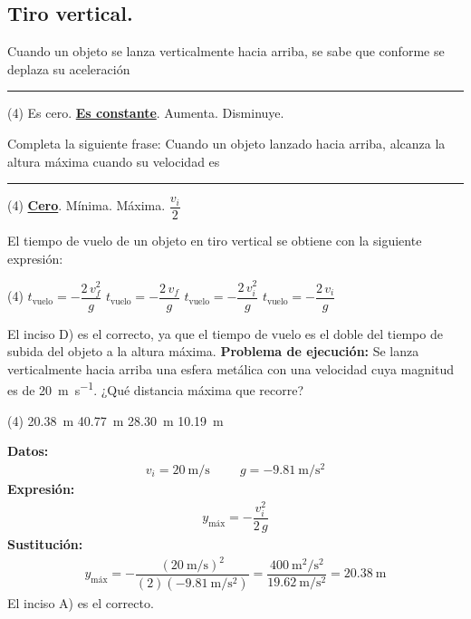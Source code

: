 \documentclass[12pt, letter]{exam}
\begin{document}
\begin{questions}
    \newpage

    \section{Tiro vertical.}

    \question Cuando un objeto se lanza verticalmente hacia arriba, se sabe que conforme se deplaza su aceleración \rule{2cm}{0.3mm}
    \begin{tasks}(4)
        \task Es cero.
        \task \underline{\textbf{Es constante}}.
        \task Aumenta.
        \task Disminuye.
    \end{tasks}
    \question Completa la siguiente frase: Cuando un objeto lanzado hacia arriba, alcanza la altura máxima cuando su velocidad es \rule{2cm}{0.3mm}
    \begin{tasks}(4)
        \task \underline{\textbf{Cero}}.
        \task Mínima.
        \task Máxima.
        \task $\dfrac{v_{i}}{2}$
    \end{tasks}
    \question El tiempo de vuelo de un objeto en tiro vertical se obtiene con la siguiente expresión:
    \begin{tasks}(4)
        \task $t_{\text{vuelo}} = - \dfrac{2 \, v_{f}^{2}}{g}$
        \task $t_{\text{vuelo}} = - \dfrac{2 \, v_{f}}{g}$
        \task $t_{\text{vuelo}} = - \dfrac{2 \, v_{i}^{2}}{g}$
        \task $t_{\text{vuelo}} = - \dfrac{2 \, v_{i}}{g}$
    \end{tasks}
    El inciso D) es el correcto, ya que el tiempo de vuelo es el doble del tiempo de subida del objeto a la altura máxima.
    \question \label{Problema_03} \textbf{Problema de ejecución: }Se lanza verticalmente hacia arriba una esfera metálica con una velocidad cuya magnitud es de \SI{20}{\meter\per\second}. ¿Qué distancia máxima que recorre?
    \begin{tasks}(4)
        \task \SI{20.38}{\meter}
        \task \SI{40.77}{\meter}
        \task \SI{28.30}{\meter}
        \task \SI{10.19}{\meter}
    \end{tasks}
    \textbf{Datos:}
    \begin{align*}
    v_{i} = \SI{20}{\meter\per\second} \hspace{1cm} g = - \SI{9.81}{\meter\per\square\second}
    \end{align*}
    \textbf{Expresión:}
    \begin{align*}
    y_{\text{máx}} = - \dfrac{v_{i}^{2}}{2 \, g}
    \end{align*}
    \textbf{Sustitución:}
    \begin{align*}
    y_{\text{máx}} = - \dfrac{\displaystyle \left( \SI{20}{\meter\per\second} \right)^{2}}{\displaystyle (2) \left( - \SI{9.81}{\meter\per\square\second} \right)} = \dfrac{\displaystyle \SI{400}{\square\meter\per\square\second}}{\displaystyle \SI{19.62}{\meter\per\square\second}} = \SI{20.38}{\meter}
    \end{align*}
    El inciso A) es el correcto.
    

\end{questions}
\end{document}

